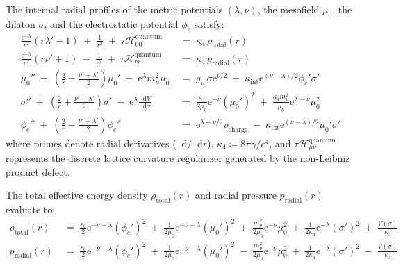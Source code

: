 \documentclass[
    12pt,
    a4paper,
    headings=normal,
    twoside=false,
    open=any,
    parskip=half
]{scrbook}
\newcommand{\diff}{\mathop{}\!\mathrm{d}}
\newcommand{\eu}{\mathrm{e}}
\begin{document}
\begin{phystheorem}\label{thm:ch3_hadronic_radial_odes}
The internal radial profiles of the metric potentials $(\lambda, \nu)$, the mesofield $\mu_0$, the dilaton $\sigma$, and the electrostatic potential $\phi_e$ satisfy:
\begin{align}
\frac{\eu^{-\lambda}}{r^2} \left( r \lambda' - 1 \right) \;+\; \frac{1}{r^2} \;+\; \tau \mathcal{H}_{00}^{\text{quantum}} &\;=\; \kappa_4 \, \rho_{\text{total}}(r) \label{eq:ch3_ode_lambda} \\
\frac{\eu^{-\lambda}}{r^2} \left( r \nu' + 1 \right) \;-\; \frac{1}{r^2} \;+\; \tau \mathcal{H}_{rr}^{\text{quantum}} &\;=\; \kappa_4 \, p_{\text{radial}}(r) \label{eq:ch3_ode_nu} \\
\mu_0'' \;+\; \left( \frac{2}{r} - \frac{\nu' + \lambda'}{2} \right) \mu_0' \;-\; \eu^\lambda m_\mu^2 \mu_0 &\;=\; g_\mu \, \sigma \eu^{\nu/2} \;+\; \kappa_{\text{int}} \eu^{(\nu-\lambda)/2} \phi_e' \sigma' \label{eq:ch3_ode_mu0} \\
\sigma'' \;+\; \left( \frac{2}{r} + \frac{\nu' - \lambda'}{2} \right) \sigma' \;-\; \eu^\lambda \frac{\diff V}{\diff\sigma} &\;=\; \frac{\kappa_4}{2\mu_0} \eu^{-\nu} (\mu_0')^2 \;+\; \frac{\kappa_4 m_\mu^2}{\mu_0} \eu^{\lambda-\nu} \mu_0^2 \label{eq:ch3_ode_sigma} \\
\phi_e'' \;+\; \left( \frac{2}{r} - \frac{\nu' + \lambda'}{2} \right) \phi_e' &\;=\; \eu^{\lambda + \nu/2} \rho_{\text{charge}} \;-\; \kappa_{\text{int}} \eu^{(\nu-\lambda)/2} \mu_0' \sigma' \label{eq:ch3_ode_phie}
\end{align}
where primes denote radial derivatives ($\diff / \diff r$), $\kappa_4 \coloneqq 8\pi\gamma/c^4$, and $\tau \mathcal{H}_{\mu\nu}^{\text{quantum}}$ represents the discrete lattice curvature regularizer generated by the non-Leibniz product defect.
\end{phystheorem}

The total effective energy density $\rho_{\text{total}}(r)$ and radial pressure $p_{\text{radial}}(r)$ evaluate to:
\begin{align}
\rho_{\text{total}}(r) &\;=\; \frac{\varepsilon_0}{2} \eu^{-\nu-\lambda} (\phi_e')^2 \;+\; \frac{1}{2\mu_0} \eu^{-\nu-\lambda} (\mu_0')^2 \;+\; \frac{m_\mu^2}{2\mu_0} \eu^{-\nu} \mu_0^2 \;+\; \frac{1}{2\kappa_4} \eu^{-\lambda} (\sigma')^2 \;+\; \frac{V(\sigma)}{\kappa_4} \label{eq:ch3_total_energy_density} \\
p_{\text{radial}}(r) &\;=\; \frac{\varepsilon_0}{2} \eu^{-\nu-\lambda} (\phi_e')^2 \;+\; \frac{1}{2\mu_0} \eu^{-\nu-\lambda} (\mu_0')^2 \;-\; \frac{m_\mu^2}{2\mu_0} \eu^{-\nu} \mu_0^2 \;+\; \frac{1}{2\kappa_4} \eu^{-\lambda} (\sigma')^2 \;-\; \frac{V(\sigma)}{\kappa_4} \label{eq:ch3_radial_pressure}
\end{align}
\end{document}
